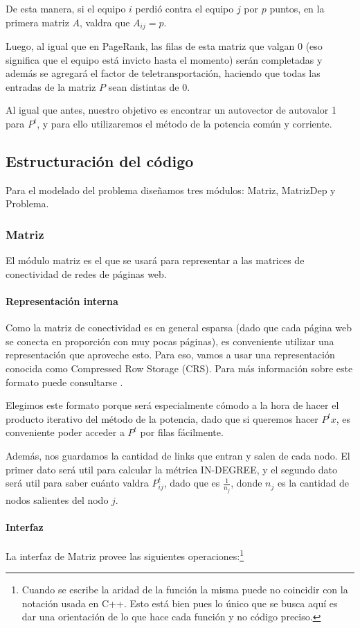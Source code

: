 De esta manera, si el equipo $i$ perdió contra el equipo $j$ por $p$ puntos, en la primera matriz $A$, valdra que $A_{ij} = p$. 

Luego, al igual que en PageRank, las filas de esta matriz que valgan 0 (eso significa que el equipo está invicto hasta el momento) serán completadas y además se agregará el factor de teletransportación, haciendo que todas las entradas de la matriz $P$ sean distintas de 0.

Al igual que antes, nuestro objetivo es encontrar un autovector de autovalor 1 para $P^t$, y para ello utilizaremos el método de la potencia común y corriente.

\subsection{Estructuración del código}
Para el modelado del problema diseñamos tres módulos: Matriz, MatrizDep y Problema. 

\subsubsection{Matriz}
El módulo matriz es el que se usará para representar a las matrices de conectividad de redes de páginas web.
\paragraph{Representación interna}

Como la matriz de conectividad es en general esparsa (dado que cada página web se conecta en proporción con muy pocas páginas), es conveniente utilizar una representación que aproveche esto. Para eso, vamos a usar una representación conocida como Compressed Row Storage (CRS). Para más información sobre este formato puede consultarse \cite{CRS}.

Elegimos este formato porque será especialmente cómodo a la hora de hacer el producto iterativo del método de la potencia, dado que si queremos hacer $P^tx$, es conveniente poder acceder a $P^t$ por filas fácilmente. 

Además, nos guardamos la cantidad de links que entran y salen de cada nodo. El primer dato será util para calcular la métrica IN-DEGREE, y el segundo dato será util para saber cuánto valdra $P^t_{ij}$, dado que es $\frac{1}{n_j}$, donde $n_j$ es la cantidad de nodos salientes del nodo $j$.

\paragraph{Interfaz}
La interfaz de Matriz provee las siguientes operaciones:\footnote{Cuando se escribe la aridad de la función la misma puede no coincidir con la notación usada en C++. Esto está bien pues lo único que se busca aquí es dar una orientación de lo que hace cada función y no código preciso.}

